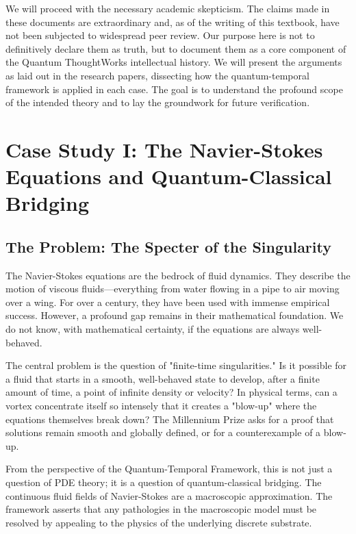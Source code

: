 \documentclass[12pt]{report}
\begin{document}
We will proceed with the necessary academic skepticism. The claims made in these documents are extraordinary and, as of the writing of this textbook, have not been subjected to widespread peer review. Our purpose here is not to definitively declare them as truth, but to document them as a core component of the Quantum ThoughtWorks intellectual history. We will present the arguments as laid out in the research papers, dissecting how the quantum-temporal framework is applied in each case. The goal is to understand the profound scope of the intended theory and to lay the groundwork for future verification.

\chapter{Case Study I: The Navier-Stokes Equations and Quantum-Classical Bridging}

\section{The Problem: The Specter of the Singularity}
The Navier-Stokes equations are the bedrock of fluid dynamics. They describe the motion of viscous fluids—everything from water flowing in a pipe to air moving over a wing. For over a century, they have been used with immense empirical success. However, a profound gap remains in their mathematical foundation. We do not know, with mathematical certainty, if the equations are always well-behaved.

The central problem is the question of "finite-time singularities." Is it possible for a fluid that starts in a smooth, well-behaved state to develop, after a finite amount of time, a point of infinite density or velocity? In physical terms, can a vortex concentrate itself so intensely that it creates a "blow-up" where the equations themselves break down? The Millennium Prize asks for a proof that solutions remain smooth and globally defined, or for a counterexample of a blow-up.

From the perspective of the Quantum-Temporal Framework, this is not just a question of PDE theory; it is a question of quantum-classical bridging. The continuous fluid fields of Navier-Stokes are a macroscopic approximation. The framework asserts that any pathologies in the macroscopic model must be resolved by appealing to the physics of the underlying discrete substrate.
\end{document}
